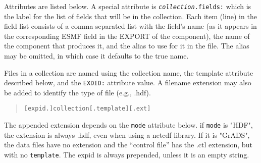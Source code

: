  Attributes are listed below. A special attribute is {\tt {\em collection}.fields:}
 which is the label for the list of fields that will be in the collection.
 Each item (line) in the field list consists of a comma separated list
 with the field's name (as it appears in
 the corresponding ESMF field in the EXPORT of the component), the name of the component that
 produces it, and the alias to use for it in the file. The alias may be omitted, in which case
 it defaults to the true name.

 Files in a collection are named using the collection name, the template attribute
 described below, 
 and the {\tt EXDID:} attribute value. A filename extension may also be added to identify the
 type of file (e.g., .hdf).
 \begin{quote}
     {\tt [expid.]collection[.template][.ext]}
 \end{quote}
 The appended extension depends on the {\tt mode} attribute below. if {\tt mode} is "HDF", 
 the extension is always .hdf, even when using a netcdf library. If it is "GrADS", the 
 data files have no extension and the ``control file'' has the .ctl extension, but with no
 {\tt template}. The expid is always prepended, unless it is an empty string.

